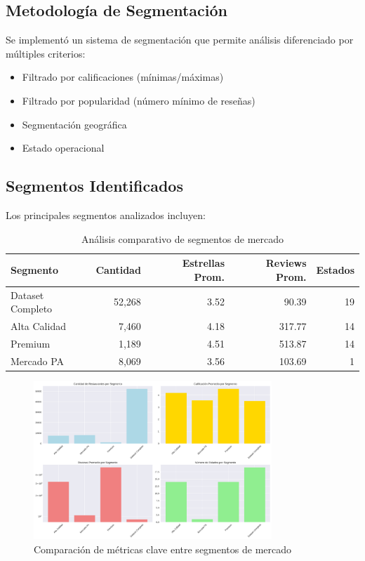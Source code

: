\documentclass[12pt,a4paper,twoside,openany]{book}
\begin{document}
\subsection{Metodología de Segmentación}

Se implementó un sistema de segmentación que permite análisis diferenciado por múltiples criterios:
\begin{itemize}
    \item Filtrado por calificaciones (mínimas/máximas)
    \item Filtrado por popularidad (número mínimo de reseñas)
    \item Segmentación geográfica
    \item Estado operacional
\end{itemize}

\subsection{Segmentos Identificados}

Los principales segmentos analizados incluyen:

\begin{table}[H]
\centering
\caption{Análisis comparativo de segmentos de mercado}
\begin{tabular}{@{}lrrrr@{}}
\toprule
\textbf{Segmento} & \textbf{Cantidad} & \textbf{Estrellas Prom.} & \textbf{Reviews Prom.} & \textbf{Estados} \\
\midrule
Dataset Completo & 52,268 & 3.52 & 90.39 & 19 \\
Alta Calidad & 7,460 & 4.18 & 317.77 & 14 \\
Premium & 1,189 & 4.51 & 513.87 & 14 \\
Mercado PA & 8,069 & 3.56 & 103.69 & 1 \\
\bottomrule
\end{tabular}
\end{table}

\begin{figure}[H]
\centering
\includegraphics[width=0.8\textwidth]{figures/comparacion_segmentos.png}
\caption{Comparación de métricas clave entre segmentos de mercado}
\label{fig:comparacion_segmentos}
\end{figure}
\end{document}
